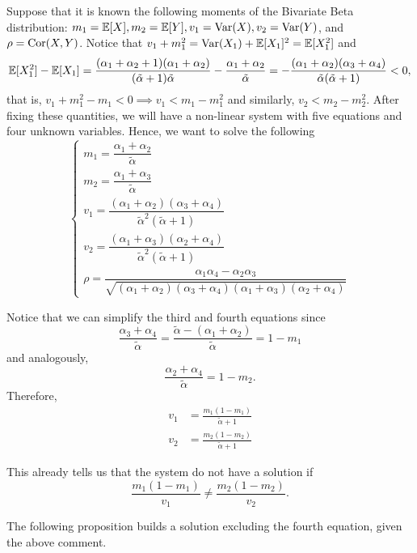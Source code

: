 Suppose that it is known the following moments of the Bivariate Beta distribution: $m_1 = \mathbb{E}[X], m_2 = \mathbb{E}[Y], v_1 = \operatorname{Var}(X), v_2 = \operatorname{Var}(Y)$, and $\rho  = \operatorname{Cor}(X,Y)$. Notice that $v_1 + m_1^2 = \operatorname{Var}(X_1) + \mathbb{E}[X_1]^2 = \mathbb{E}[X_1^2]$ and
$$
\mathbb{E}[X_1^2] - \mathbb{E}[X_1] = \frac{(\alpha_1 + \alpha_2 + 1)(\alpha_1 + \alpha_2)}{(\tilde{\alpha} + 1)\tilde{\alpha}} - \frac{\alpha_1 + \alpha_2}{\tilde{\alpha}} = -\frac{(\alpha_1 + \alpha_2)(\alpha_3 + \alpha_4)}{\tilde{\alpha}(\tilde{\alpha}+1)} < 0, 
$$
that is, $v_1 + m_1^2 - m_1 < 0 \implies v_1 < m_1 - m_1^2$ and similarly,
$v_2 < m_2 - m_2^2$. After fixing these quantities, we will have a non-linear system with five equations and four
unknown variables. Hence, we want to solve the following 
\begin{equation}
  \label{eq:system-moments-alpha}
  \begin{cases}
    m_1 = \dfrac{\alpha_1+\alpha_2}{\tilde{\alpha}} \\
    m_2 = \dfrac{\alpha_1+\alpha_3}{\tilde{\alpha}} \\ 
    v_1 = \dfrac{(\alpha_1+\alpha_2)(\alpha_3+\alpha_4)}{\tilde{\alpha}^2(\tilde{\alpha}+1)} \\
    v_2 = \dfrac{(\alpha_1+\alpha_3)(\alpha_2+\alpha_4)}{\tilde{\alpha}^2(\tilde{\alpha}+1)} \\
    \rho = \dfrac{\alpha_1\alpha_4 - \alpha_2\alpha_3}{\sqrt{(\alpha_1+\alpha_2)(\alpha_3+\alpha_4)(\alpha_1+\alpha_3)(\alpha_2+\alpha_4)}}
  \end{cases}
\end{equation}

Notice that we can simplify the third and fourth equations since 
$$
\frac{\alpha_3 + \alpha_4}{\tilde{\alpha}} = \frac{\tilde{\alpha} - (\alpha_1 + \alpha_2)}{\tilde{\alpha}} = 1 - m_1 
$$
and analogously, 
$$
\frac{\alpha_2 + \alpha_4}{\tilde{\alpha}} = 1 - m_2. 
$$
Therefore, 
\begin{align*}
    v_1 &= \frac{m_1(1 - m_1)}{\tilde{\alpha} + 1} \\
    v_2 &= \frac{m_2(1 - m_2)}{\tilde{\alpha} + 1}
\end{align*}

This already tells us that the system do not have a solution if 
$$
\frac{m_1(1-m_1)}{v_1} \neq \frac{m_2(1-m_2)}{v_2}. 
$$

The following proposition builds a solution excluding the fourth equation, given the above comment. 

